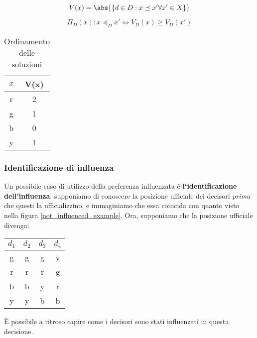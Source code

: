 \documentclass[\main/main.tex]{subfiles}
\begin{document}
\[
	V(x) = \abs{\{d \in D: x \preceq x' \forall x' \in X \}}
\]

\[
	\Pi_D(x): x \preceq_D x' \Leftrightarrow V_D(x) \geq V_D(x')
\]

\begin{table}
	\begin{tabular}{|c|c|}
		\hline
		$x$ & V(x) \\
		\hline
		r   & 2    \\
		\hline
		g   & 1    \\
		\hline
		b   & 0    \\
		\hline
		y   & 1    \\
		\hline
	\end{tabular}
	\caption{Ordinamento delle soluzioni}
\end{table}

\subsubsection{Identificazione di influenza}
Un possibile caso di utilizzo della preferenza influenzata è \textbf{l`identificazione dell'influenza}: supponiamo di conoscere la posizione ufficiale dei decisori \textit{prima} che questi la ufficializzino, e immaginiamo che essa coincida con quanto visto nella figura \ref{not_influenced_example}. Ora, supponiamo che la posizione ufficiale divenga:

\begin{table}
	\begin{tabular}{|c|c|c|c|}
		\hline
		\rowcolor{gray!10} $d_1$ & $d_2$                   & $d_3$                   & $d_4$                   \\
		\hline
		\cellcolor{green!50} g   & \cellcolor{green!50} g  & \cellcolor{green!50} g  & \cellcolor{yellow!50} y \\
		\hline
		\cellcolor{red!50} r     & \cellcolor{red!50} r    & \cellcolor{red!50} r    & \cellcolor{green!50} g  \\
		\hline
		\cellcolor{blue!50} b    & \cellcolor{blue!50} b   & \cellcolor{yellow!50} y & \cellcolor{red!50} r    \\
		\hline
		\cellcolor{yellow!50} y  & \cellcolor{yellow!50} y & \cellcolor{blue!50} b   & \cellcolor{blue!50} b   \\
		\hline
	\end{tabular}
	\label{influenced_example}
\end{table}

È possibile a ritroso capire come i decisori sono stati influenzati in questa decisione.
\end{document}
